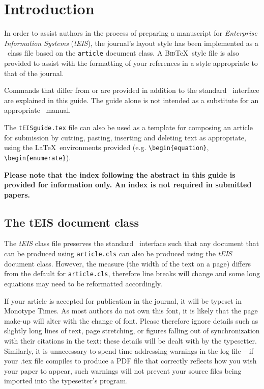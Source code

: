 \documentclass[]{tEIS2e}
\theoremstyle{plain}
\theoremstyle{remark}
\begin{document}
\section{Introduction}

In order to assist authors in the process of preparing a manuscript for {\itshape Enterprise Information Systems} ({\it tEIS}), the journal's layout style has been implemented as a \LaTeXe\ class file based on the {\tt article} document class. A \textsc{Bib}\TeX\ style file is also provided to assist with the formatting of your references in a style appropriate to that of the journal.

Commands that differ from or are provided in addition to the standard \LaTeXe\ interface are explained in this guide. The guide alone is not intended as a substitute for an appropriate \LaTeXe\ manual.

The \texttt{tEISguide.tex} file can also be used as a template for composing an article for submission by cutting, pasting, inserting and
deleting text as appropriate, using the \LaTeX\ environments provided (e.g. \verb"\begin{equation}",
\verb"\begin{enumerate}").

{\bf{Please note that the index following the abstract in this guide is provided for information only. An index is not required in submitted papers.}}


\subsection{The {\bi tEIS} document class}\label{S1.1}

The \textit{tEIS} class file preserves the standard \LaTeXe\ interface such that any document that can
be produced using {\tt article.cls} can also be produced using the {\it tEIS} document class.
However, the measure (the width of the text on a page) differs from the default for {\tt article.cls}, therefore line breaks
will change and some long equations may need to be reformatted accordingly.

If your article is accepted for publication in the journal, it will be typeset in Monotype Times. As most authors do not own this font, it is likely that the page make-up will alter with the change of font. Please therefore ignore details such as slightly long lines of text, page stretching, or figures falling out of synchronization with their citations in the text: these details will be dealt with by the typesetter. Similarly, it is unnecessary to spend time addressing warnings in the log file -- if your .tex file compiles to produce a PDF file that correctly reflects how you wish your paper to appear, such warnings will not prevent your source files being imported into the typesetter's program.
\end{document}
